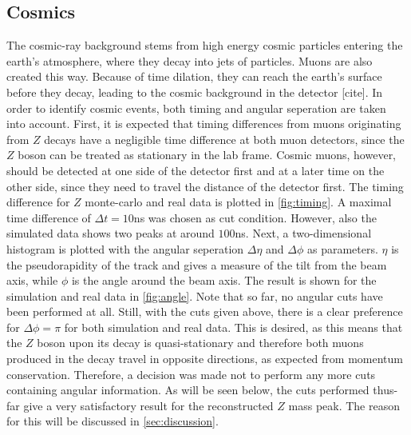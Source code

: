 \documentclass[twoside,        %
               BCOR12mm,       %
               ngerman,english, %
               fleqn,headsepline=false,footsepline=false
              ]{Vorlage/MFPREPORT}
\begin{document}
\subsection{Cosmics}
The cosmic-ray background stems from high energy cosmic particles entering the
earth's atmosphere, where they decay into jets of particles. Muons are also
created this way. Because of time dilation, they can reach the earth's surface
before they decay, leading to the cosmic background in the detector [cite].
In order to identify cosmic events, both timing and angular seperation are
taken into account. First, it is expected that timing differences from muons
originating from $Z$ decays have a negligible time difference at both muon
detectors, since the $Z$ boson can be treated as stationary in the lab frame.
Cosmic muons, however, should be detected at one side of the detector first and
at a later time on the other side, since they need to travel the distance of
the detector first. The timing difference for $Z$ monte-carlo and real data is
plotted in \cref{fig:timing}. A maximal time difference of $\Delta t=10$\;ns
was chosen as cut condition. However, also the simulated data shows two peaks
at around $100$\;ns.
Next, a two-dimensional histogram is plotted with the angular seperation
$\Delta\eta$ and $\Delta\phi$ as parameters. $\eta$ is the pseudorapidity of the
track and gives a measure of the tilt from the beam axis, while $\phi$  is the
angle around the beam axis. The result is shown for the simulation and real
data in \cref{fig:angle}. Note that so far, no angular cuts have been performed
at all. Still, with the cuts given above, there is a clear preference for
$\Delta\phi=\pi$ for both simulation and real data. This is desired, as this
means that the $Z$ boson upon its decay is quasi-stationary and therefore both
muons produced in the decay travel in opposite directions, as expected from
momentum conservation. Therefore, a decision was made not to perform any more
cuts containing angular information. As will be seen below, the cuts performed
thus-far give a very satisfactory result for the reconstructed $Z$ mass peak.
The reason for this will be discussed in \cref{sec:discussion}.
\end{document}
